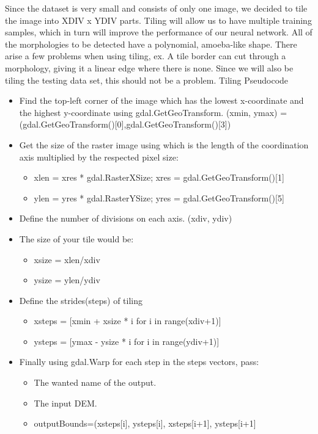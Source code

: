 \documentclass[sigconf,natbib=false]{acmart}
\begin{document}
Since the dataset is very small and consists of only one image, we decided to tile the image into XDIV x YDIV parts. Tiling will allow us to have multiple training samples, which in turn will improve the performance of our neural network. All of the morphologies to be detected have a polynomial, amoeba-like shape. There arise a few problems when using tiling, ex. A tile border can cut through a morphology, giving it a linear edge where there is none. Since we will also be tiling the testing data set, this should not be a problem.
\hspace*{-0.4cm}
Tiling Pseudocode
\begin{itemize}
    \item Find the top-left corner of the image which has the lowest x-coordinate and the highest y-coordinate using gdal.GetGeoTransform.
    (xmin, ymax) = (gdal.GetGeoTransform()[0],gdal.GetGeoTransform()[3])
    \item Get the size of the raster image using which is the length of the coordination axis multiplied by the respected pixel size:
    \begin{itemize}
        \item xlen = xres * gdal.RasterXSize; xres = gdal.GetGeoTransform()[1]
        \item ylen = yres * gdal.RasterYSize; yres = gdal.GetGeoTransform()[5]
    \end{itemize}
    \item Define the number of divisions on each axis. (xdiv, ydiv)
    \item The size of your tile would be:
     \begin{itemize}
        \item xsize = xlen/xdiv
        \item ysize = ylen/ydiv
    \end{itemize}
    \item Define the strides(steps) of tiling
    \begin{itemize}
        \item xsteps = [xmin + xsize * i for i in range(xdiv+1)]
        \item ysteps = [ymax - ysize * i for i in range(ydiv+1)]
    \end{itemize}
    \item Finally using gdal.Warp for each step in the steps vectors, pass:
    \begin{itemize}
        \item The wanted name of the output.
        \item The input DEM.
        \item outputBounds=(xsteps[i], ysteps[i], xsteps[i+1], ysteps[i+1]
    \end{itemize}
\end{itemize}
\end{document}
